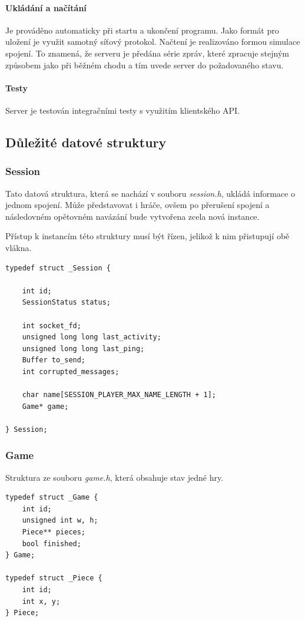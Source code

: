 \documentclass[12pt, a4paper]{report}
\begin{document}
\paragraph{Ukládání a načítání}
Je prováděno automaticky při startu a ukončení programu. Jako formát pro uložení je využit samotný síťový protokol. Načtení je realizováno formou simulace spojení. To znamená, že serveru je předána série zpráv, které zpracuje stejným způsobem jako při běžném chodu a tím uvede server do požadovaného stavu.

\paragraph{Testy}
Server je testován integračními testy s využitím klientského API.


\subsection{Důležité datové struktury}

\subsubsection*{Session}
Tato datová struktura, která se nachází v souboru \emph{session.h}, ukládá informace o jednom spojení. Může představovat i hráče, ovšem po přerušení spojení a následovném opětovném navázání bude vytvořena zcela nová instance.

Přístup k instancím této struktury musí být řízen, jelikož k nim přistupují obě vlákna.

\begin{lstlisting}
typedef struct _Session {

	int id;
	SessionStatus status;
	
	int socket_fd;
	unsigned long long last_activity;
	unsigned long long last_ping;
	Buffer to_send;
	int corrupted_messages;
	
	char name[SESSION_PLAYER_MAX_NAME_LENGTH + 1];
	Game* game;

} Session;
\end{lstlisting}

\subsubsection*{Game}
Struktura ze souboru \emph{game.h}, která obsahuje stav jedné hry.

\begin{lstlisting}
typedef struct _Game {
	int id;
	unsigned int w, h;
	Piece** pieces;
	bool finished;
} Game;

typedef struct _Piece {
	int id;
	int x, y;
} Piece;
\end{lstlisting}
\end{document}
